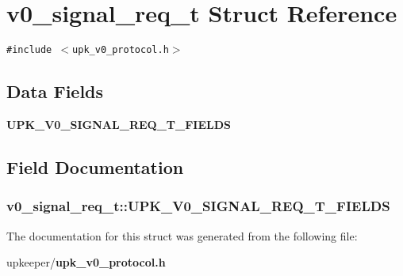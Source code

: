 \section{v0\_\-signal\_\-req\_\-t Struct Reference}
\label{structv0__signal__req__t}
{\tt \#include $<$upk\_\-v0\_\-protocol.h$>$}

\subsection*{Data Fields}
\begin{CompactItemize}
\item 
\bf{UPK\_\-V0\_\-SIGNAL\_\-REQ\_\-T\_\-FIELDS}
\end{CompactItemize}


\subsection{Field Documentation}
\subsubsection{\setlength{\rightskip}{0pt plus 5cm}\bf{v0\_\-signal\_\-req\_\-t::UPK\_\-V0\_\-SIGNAL\_\-REQ\_\-T\_\-FIELDS}}\label{structv0__signal__req__t_15d17bd803c798f675dad4b7b201d87f}




The documentation for this struct was generated from the following file:\begin{CompactItemize}
\item 
upkeeper/\bf{upk\_\-v0\_\-protocol.h}\end{CompactItemize}
